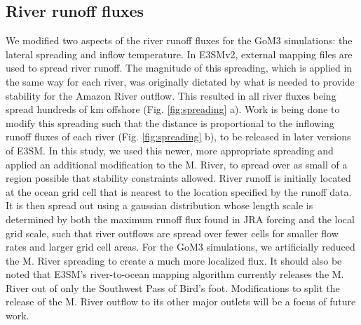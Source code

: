 \subsection{River runoff fluxes}
We modified two aspects of the river runoff fluxes for the GoM3 simulations: the lateral spreading and inflow temperature. In E3SMv2, external mapping files are used to spread river runoff. The magnitude of this spreading, which is applied in the same way for each river, was originally dictated by what is needed to provide stability for the Amazon River outflow. This resulted in all river fluxes being spread hundreds of km offshore (Fig. \ref{fig:spreading} a). Work is being done to modify this spreading such that the distance is proportional to the inflowing runoff fluxes of each river (Fig. \ref{fig:spreading} b), to be released in later versions of E3SM. In this study, we used this newer, more appropriate spreading and applied an additional modification to the M. River, to spread over as small of a region possible that stability constraints allowed. River runoff is initially located at the ocean grid cell that is nearest to the location specified by the runoff data. It is then spread out using a gaussian distribution whose length scale is determined by both the maximum runoff flux found in JRA forcing and the local grid scale, such that river outflows are spread over fewer cells for smaller flow rates and larger grid cell areas. For the GoM3 simulations, we artificially reduced the M. River spreading to create a much more localized flux. It should also be noted that E3SM's river-to-ocean mapping algorithm currently releases the M. River out of only the Southwest Pass of Bird's foot. Modifications to split the release of the M. River outflow to its other major outlets will be a focus of future work.

